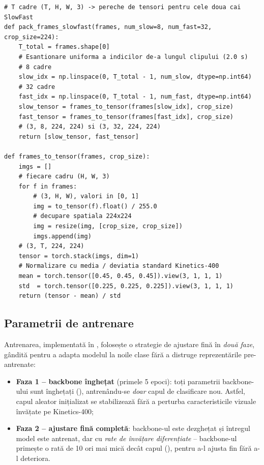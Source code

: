 \documentclass[../../main.tex]{subfiles}
\begin{document}
\begin{listing}[H]
\begin{verbatim}
# T cadre (T, H, W, 3) -> pereche de tensori pentru cele doua cai SlowFast
def pack_frames_slowfast(frames, num_slow=8, num_fast=32, crop_size=224):
    T_total = frames.shape[0]
    # Esantionare uniforma a indicilor de-a lungul clipului (2.0 s)
    # 8 cadre
    slow_idx = np.linspace(0, T_total - 1, num_slow, dtype=np.int64)
    # 32 cadre
    fast_idx = np.linspace(0, T_total - 1, num_fast, dtype=np.int64)
    slow_tensor = frames_to_tensor(frames[slow_idx], crop_size)
    fast_tensor = frames_to_tensor(frames[fast_idx], crop_size)
    # (3, 8, 224, 224) si (3, 32, 224, 224)
    return [slow_tensor, fast_tensor]

def frames_to_tensor(frames, crop_size):
    imgs = []
    # fiecare cadru (H, W, 3)
    for f in frames:
        # (3, H, W), valori in [0, 1]
        img = to_tensor(f).float() / 255.0
        # decupare spatiala 224x224
        img = resize(img, [crop_size, crop_size])
        imgs.append(img)
    # (3, T, 224, 224)
    tensor = torch.stack(imgs, dim=1)
    # Normalizare cu media / deviatia standard Kinetics-400
    mean = torch.tensor([0.45, 0.45, 0.45]).view(3, 1, 1, 1)
    std  = torch.tensor([0.225, 0.225, 0.225]).view(3, 1, 1, 1)
    return (tensor - mean) / std
\end{verbatim}
\caption{Construcția perechii de intrări slow/fast (\texttt{pack\_frames\_slowfast} din \texttt{data/dataset.py}).}
\label{lst:slowfast_pack}
\end{listing}

\subsection{Parametrii de antrenare}
\label{subsec:parametri_actiuni}

Antrenarea, implementată în , folosește o strategie de ajustare fină în
\textit{două faze}, gândită pentru a adapta modelul la noile clase fără a distruge reprezentările
pre-antrenate:

\begin{itemize}
    \item \textbf{Faza 1 -- backbone înghețat} (primele 5 epoci): toți parametrii backbone-ului
    sunt înghețați (), antrenându-se \textit{doar} capul de
    clasificare nou. Astfel, capul aleator inițializat se stabilizează fără a perturba
    caracteristicile vizuale învățate pe Kinetics-400;
    \item \textbf{Faza 2 -- ajustare fină completă}: backbone-ul este dezghețat și întregul model este
    antrenat, dar cu \textit{rate de învățare diferențiate} -- backbone-ul primește o rată de 10
    ori mai mică decât capul (), pentru a-l ajusta fin fără a-l
    deteriora.
\end{itemize}
\end{document}
